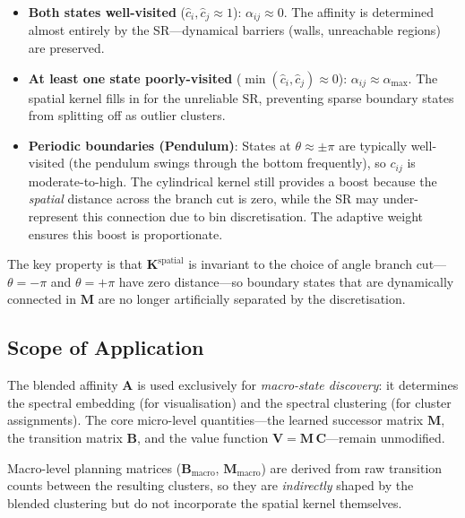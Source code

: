 \begin{itemize}[leftmargin=2em]
\item \textbf{Both states well-visited}
($\hat{c}_i, \hat{c}_j \approx 1$): $\alpha_{ij} \approx 0$.
The affinity is determined almost entirely by the SR---dynamical barriers
(walls, unreachable regions) are preserved.

\item \textbf{At least one state poorly-visited}
($\min(\hat{c}_i, \hat{c}_j) \approx 0$):
$\alpha_{ij} \approx \alpha_{\max}$.  The spatial kernel fills in for the
unreliable SR, preventing sparse boundary states from splitting off as
outlier clusters.

\item \textbf{Periodic boundaries (Pendulum)}:  States at
$\theta \approx \pm\pi$ are typically well-visited (the pendulum swings
through the bottom frequently), so $c_{ij}$ is moderate-to-high.  The
cylindrical kernel still provides a boost because the \emph{spatial}
distance across the branch cut is zero, while the SR may under-represent
this connection due to bin discretisation.  The adaptive weight ensures
this boost is proportionate.
\end{itemize}

The key property is that $\mathbf{K}^{\text{spatial}}$ is invariant to
the choice of angle branch cut---$\theta = -\pi$ and $\theta = +\pi$
have zero distance---so boundary states that are dynamically connected in
$\mathbf{M}$ are no longer artificially separated by the discretisation.

\subsection{Scope of Application}

The blended affinity $\mathbf{A}$ is used exclusively for \emph{macro-state
discovery}: it determines the spectral embedding (for visualisation) and
the spectral clustering (for cluster assignments).  The core micro-level
quantities---the learned successor matrix $\mathbf{M}$, the transition
matrix $\mathbf{B}$, and the value function
$\mathbf{V} = \mathbf{M}\,\mathbf{C}$---remain unmodified.

Macro-level planning matrices ($\mathbf{B}_{\text{macro}}$,
$\mathbf{M}_{\text{macro}}$) are derived from raw transition counts
between the resulting clusters, so they are \emph{indirectly} shaped by
the blended clustering but do not incorporate the spatial kernel
themselves.

